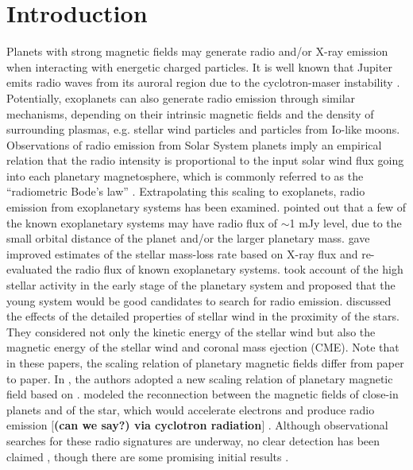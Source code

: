 \documentclass[iop,numberedappendix,apj]{emulateapj}
\def\memoYF#1{\color{red}$[${\bf #1}$]$ \color{black}}
\def\memoTM#1{\color{DarkGreen}$[${\bf #1}$]$ \color{black}}
\begin{document}
\section{Introduction}
\label{sec:intro}


Planets with strong magnetic fields may generate radio and/or X-ray emission when interacting with energetic charged particles. 
It is well known that Jupiter emits radio waves from its auroral region due to the cyclotron-maser instability \citep[e.g.][]{wu1979,zarka1998}.  %
Potentially, exoplanets can also generate radio emission through similar mechanisms, depending on their intrinsic magnetic fields and the density of surrounding plasmas, e.g. stellar wind particles and particles from Io-like moons. 
Observations of radio emission from Solar System planets imply an empirical relation that the radio intensity is proportional to the input solar wind flux going into each planetary magnetosphere, which is commonly referred to as the ``radiometric Bode's law'' \citep{desch+kaiser1984}. 
Extrapolating this scaling to exoplanets, radio emission from exoplanetary systems has been examined. 
\citet{farrell1999,zarka2001,lazio2004} pointed out that a few of the known exoplanetary systems may have radio flux of $\sim $1 mJy level, due to the small orbital distance of the planet and/or the larger planetary mass. 
\citet{stevens2005} gave improved estimates of the stellar mass-loss rate based on X-ray flux and re-evaluated the radio flux of known exoplanetary systems. 
\citet{griesmeier2005} took account of the high stellar activity in the early stage of the planetary system and proposed that the young system would be good candidates to search for radio emission. 
\citet{griesmeier2007a, griesmeier2007b} discussed the effects of the detailed properties of stellar wind in the proximity of the stars. They considered not only the kinetic energy of the stellar wind but also the magnetic energy of the stellar wind and coronal mass ejection (CME). 
Note that in these papers, the scaling relation of planetary magnetic fields differ from paper to paper.
In \citet{reiners2010}, the authors adopted a new scaling relation of planetary magnetic field based on \citet{christensen_et_al2009}.
\citet{jardine2008} modeled the reconnection between the magnetic fields of close-in planets and of the star, which would accelerate electrons and produce radio emission \memoTM{(can we say?) via cyclotron radiation}.
Although observational searches for these radio signatures are underway, no clear detection has been claimed \citep{bastian2000,george2007,stroe2012,hallinan2013,murphy2015}, though there are some promising initial results \citep{lecavelier_et_al2013,sirothia2014}.
\end{document}
